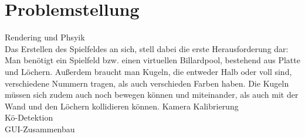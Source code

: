 
\chapter{Problemstellung}
Rendering und Phsyik \\
Das Erstellen des Spielfeldes an sich, stell dabei die erste Herausforderung dar: Man benötigt ein Spielfeld bzw. einen virtuellen Billardpool, bestehend aus Platte und Löchern. 
Außerdem braucht man Kugeln, die entweder Halb oder voll sind, verschiedene Nummern tragen, als auch verschieden Farben haben. 
Die Kugeln müssen sich zudem auch noch bewegen können und miteinander, als auch mit der Wand und den Löchern kollidieren können. 
Kamera Kalibrierung \\
Kö-Detektion \\
GUI-Zusammenbau \\

